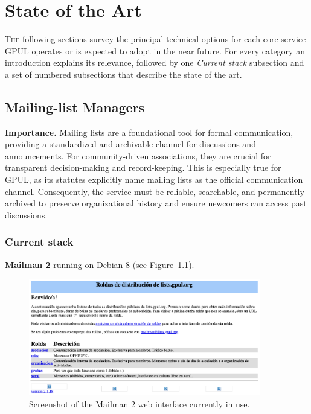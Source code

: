 %

\chapter{State of the Art}
\label{chap:state-of-the-art}

\lettrine{T}{he} following sections survey the principal technical options for each core service GPUL operates or is expected to adopt in the near future.  
For every category an introduction explains its relevance, followed by one \emph{Current stack} subsection and a set of numbered subsections that describe the state of the art.  

\section{Mailing-list Managers}

\textbf{Importance.} Mailing lists are a foundational tool for formal communication, providing a standardized and archivable channel for discussions and announcements. For community-driven associations, they are crucial for transparent decision-making and record-keeping. This is especially true for GPUL, as its statutes explicitly name mailing lists as the official communication channel. Consequently, the service must be reliable, searchable, and permanently archived to preserve organizational history and ensure newcomers can access past discussions.

\subsection*{Current stack}
\textbf{Mailman 2} running on Debian 8 (see Figure~\ref{fig:mailman2}).

\begin{figure}[h!]
  \centering
  \includegraphics[width=0.9\textwidth]{imaxes/mailman-2-current.png}
  \caption{Screenshot of the Mailman 2 web interface currently in use.}
  \label{fig:mailman2}
\end{figure}

